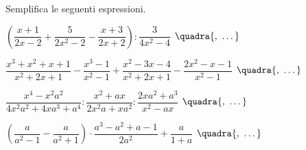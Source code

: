 \begin{esercizio}[\Ast]
\begin{enumeratea}
\end{enumeratea}
\end{esercizio}

\begin{esercizio}
\label{ese:19.42}
Semplifica le seguenti espressioni.
\begin{enumeratea}
 \item \(\left(\dfrac{x+1}{2x-2}+\dfrac{5}{2x^{2}-2}-\dfrac{x+3}{2x+2}\right):
        \dfrac{3}{4x^{2}-4}\)
  \hfill {\footnotesize \(\quadra{,~\dots}\)}
 \item \(\dfrac{x^{3}+x^{2}+x+1}{x^{2}+2x+1}-\dfrac{x^{3}-1}{x^{2}-1}+
        \dfrac{x^{2}-3x-4}{x^{2}+2x+1}-\dfrac{2x^{2}-x-1}{x^{2}-1}\)
  \hfill {\footnotesize \(\quadra{,~\dots}\)}
 \item \(\dfrac{x^{4}-x^{2}a^{2}}{4x^{2}a^{2}+4xa^{3}+a^{4}}:
        \dfrac{x^{2}+ax}{2x^{2}a+xa^{2}}:\dfrac{2xa^{2}+a^{3}}{x^{2}-ax}\)
  \hfill {\footnotesize \(\quadra{,~\dots}\)}
 \item \(\left(\dfrac{a}{a^{2}-1}-\dfrac{a}{a^{2}+1}\right)\cdot
        \dfrac{a^{3}-a^{2}+a-1}{2a^{2}}+\dfrac{a}{1+a}\)
  \hfill {\footnotesize \(\quadra{,~\dots}\)}
\end{enumeratea}
\end{esercizio}

